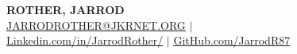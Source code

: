 \documentclass[11pt, letterpaper]{article}
\begin{document}


\begin{center}
  \textbf{\Huge \scshape ROTHER, JARROD} \\ \vspace{1pt} %
   \href{mailto:JARRODROTHER@JKRNET.ORG}{\underline{JARRODROTHER@JKRNET.ORG}} $|$\\
   \href{https://www.linkedin.com/in/jarrodrother/}{\underline{Linkedin.com/in/JarrodRother/}} $|$
   \href{https://github.com/JarrodR87}{\underline{GitHub.com/JarrodR87}}
\end{center}


\end{document}
